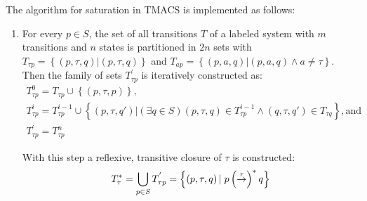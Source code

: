 The algorithm for saturation in TMACS is implemented as follows: 
\begin{enumerate}
\item For every ${p\in \mathit{S}}$, the set of all transitions $T$ of a labeled system with $m$ transitions and $n$ states is partitioned in ${2n}$ sets with ${T_{\mathit{\tau p}}=\left\{\left(p,\tau,q\right)| \left(p,\tau,q\right)\right\}}$ and ${T_{ap}=\left\{\left(p,a,q\right)| \left(p,a,q\right)\wedge a\neq\tau\right\}}$. 
\\
Then the family of sets ${T^{'}_{\tau p}}$ is iteratively constructed as:
\begin{equation*}
	\begin{array}{lcl}
		{T^{0}_{\mathit{\tau p}}=T_{\mathit{\tau p}}\cup\left\{\left(p,\tau,p\right)\right\}},\\
		{T^{i}_{\mathit{\tau p}}=T^{i-1}_{\mathit{\tau p}}\cup\left\{\left(p,\tau,q'\right)|\left(\exists q\in \mathit{S}\right)\left(p,\tau,q\right)\in T^{i-1}_{\mathit{\tau p}}\wedge\left(q,\tau,q'\right)\in T_{\mathit{\tau q}}\right\}}, \text{and} \\
		{T^{'}_{\mathit{\tau p}}=T^{n}_{\mathit{\tau p}}}
	\end{array}
\end{equation*}

With this step a reflexive, transitive closure of $\tau$ is constructed:
\begin{equation*}
	{T^{*}_{\tau}=\bigcup_{p\in \mathit{S}}T^{'}_{\tau p}=\left\{\left(p,\tau,q\right)|\hspace{1mm}p\left(\stackrel{\tau}{\rightarrow}\right)^{*}q\right\}}
\end{equation*}


\end{enumerate}
